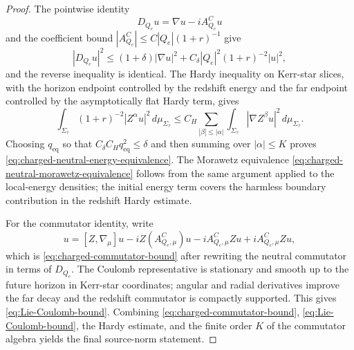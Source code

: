 \documentclass[11pt]{article}
\numberwithin{equation}{section}
\theoremstyle{plain}
\theoremstyle{definition}
\theoremstyle{remark}
\begin{document}
\begin{proof}
The pointwise identity
\begin{equation}\label{eq:D-vs-nabla-hard}
 D_{Q_e}u=\nabla u-iA^C_{Q_e}u
\end{equation}
and the coefficient bound \(|A^C_{Q_e}|\le C|Q_e|(1+r)^{-1}\) give
\begin{equation}\label{eq:D-nabla-estimate}
 |D_{Q_e}u|^2\le (1+\delta)|\nabla u|^2+C_\delta |Q_e|^2(1+r)^{-2}|u|^2,
\end{equation}
and the reverse inequality is identical.  The Hardy inequality on Kerr-star slices, with the horizon endpoint controlled by the redshift energy and the far endpoint controlled by the asymptotically flat Hardy term, gives
\begin{equation}\label{eq:kerr-hard-small-electric}
 \int_{\Sigma_\tau}(1+r)^{-2}|Z^\alpha u|^2\,d\mu_{\Sigma_\tau}
 \le C_H\sum_{|\beta|\le |\alpha|}\int_{\Sigma_\tau}|\nabla Z^\beta u|^2\,d\mu_{\Sigma_\tau}.
\end{equation}
Choosing \(q_{\mathrm{eq}}\) so that \(C_\delta C_Hq_{\mathrm{eq}}^2\le\delta\) and then summing over \(|\alpha|\le K\) proves \eqref{eq:charged-neutral-energy-equivalence}.  The Morawetz equivalence \eqref{eq:charged-neutral-morawetz-equivalence} follows from the same argument applied to the local-energy densities; the initial energy term covers the harmless boundary contribution in the redshift Hardy estimate.

For the commutator identity, write
\begin{equation}
 [Z,D_{Q_e,\mu}]u=[Z,\nabla_\mu]u-iZ(A^C_{Q_e,\mu})u-iA^C_{Q_e,\mu}Zu+iA^C_{Q_e,\mu}Zu,
\end{equation}
which is \eqref{eq:charged-commutator-bound} after rewriting the neutral commutator in terms of \(D_{Q_e}\).  The Coulomb representative is stationary and smooth up to the future horizon in Kerr-star coordinates; angular and radial derivatives improve the far decay and the redshift commutator is compactly supported.  This gives \eqref{eq:Lie-Coulomb-bound}.  Combining \eqref{eq:charged-commutator-bound}, \eqref{eq:Lie-Coulomb-bound}, the Hardy estimate, and the finite order \(K\) of the commutator algebra yields the final source-norm statement.
\end{proof}
\end{document}

